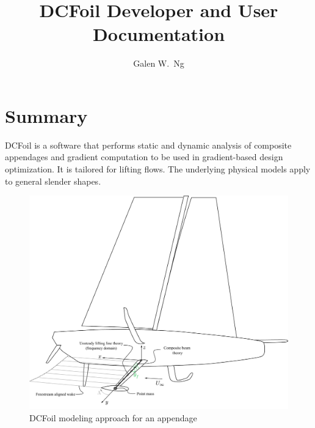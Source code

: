 \documentclass[10pt]{article}
\begin{document}
\title{\vspace{-1.5cm} DCFoil Developer and User Documentation}
\author{Galen W.~Ng}
\maketitle
\section*{Summary}
% 
DCFoil is a software that performs static and dynamic analysis of composite appendages and gradient computation to be used in gradient-based design optimization.
It is tailored for lifting flows.
The underlying physical models apply to general slender shapes.
\begin{figure}[htbp!]
	\centering
	\includegraphics[width=1.0\linewidth,clip,trim={0cm 0cm 0cm 10cm}]{keel-dcfoil.pdf}
	\caption{\label{fig:keel-dcfoil}
		DCFoil modeling approach for an appendage
	}
\end{figure}

\clearpage
\tableofcontents
\clearpage
\end{document}
